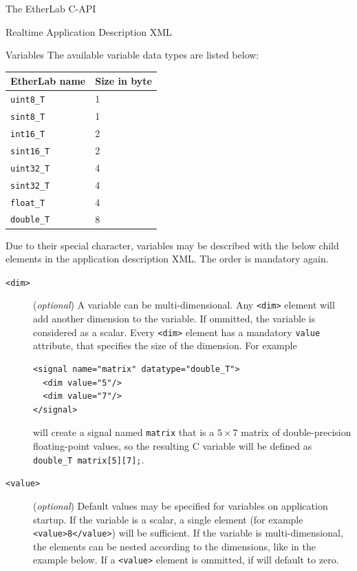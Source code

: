 \begin{ighsec}{The EtherLab C-API}
\begin{ighsec}{Realtime Application Description XML}
\begin{ighsec}{Variables}
The available variable data types are listed below:

\begin{center}
\begin{tabular}{|l|l|}
EtherLab name & Size in byte\\\hline\hline
\lstinline+uint8_T+ & 1\\
\lstinline+sint8_T+ & 1\\
\lstinline+int16_T+ & 2\\
\lstinline+sint16_T+ & 2\\
\lstinline+uint32_T+ & 4\\
\lstinline+sint32_T+ & 4\\
\lstinline+float_T+ & 4\\
\lstinline+double_T+ & 8\\\hline
\end{tabular}
\end{center}

Due to their special character, variables may be described with the below
child elements in the application description XML. The order is mandatory
again.

\begin{description}

\item[\small\texttt{<dim>}] (\textit{optional}) A variable can be
multi-dimensional. Any \texttt{<dim>} element will add another dimension to
the variable. If ommitted, the variable is considered as a scalar. Every
\texttt{<dim>} element has a mandatory \texttt{value} attribute, that
specifies the size of the dimension. For example

\begin{lstlisting}
<signal name="matrix" datatype="double_T">
  <dim value="5"/>
  <dim value="7"/>
</signal>
\end{lstlisting}

will create a signal named \texttt{matrix} that is a $5\times7$ matrix of
double-precision floating-point values, so the resulting C variable will be
defined as \lstinline{double_T matrix[5][7];}.

\item[\small\texttt{<value>}] (\textit{optional}) Default values may be
specified for variables on application startup. If the variable is a scalar, a
single element (for example \lstinline+<value>8</value>+) will be sufficient.
If the variable is multi-dimensional, the elements can be nested according to
the dimensions, like in the example below. If a \texttt{<value>} element is
ommitted, if will default to zero.


\end{description}
\end{ighsec}
\end{ighsec}
\end{ighsec}
